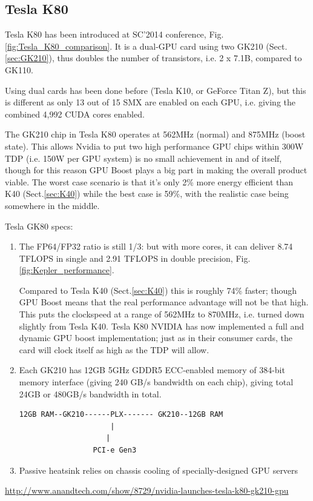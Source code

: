 \subsection{Tesla K80}
\label{sec:K80}

Tesla K80 has been introduced at SC'2014 conference,
Fig.\ref{fig:Tesla_K80_comparison}. It is a dual-GPU card using two GK210
(Sect.\ref{sec:GK210}), thus doubles the number of transistors, i.e. 2 x 7.1B,
compared to GK110. 

\begin{mdframed}
Using dual cards has been done before (Tesla K10, or GeForce Titan Z), but this
is different as only 13 out of 15 SMX are enabled on each GPU, i.e. giving the
combined  4,992 CUDA cores enabled. 

The GK210 chip in Tesla K80 operates at 562MHz (normal) and 875MHz (boost
state). This allows Nvidia to put two high performance GPU chips within 300W TDP
(i.e. 150W per GPU system) is no small achievement in and of itself, though for
this reason GPU Boost plays a big part in making the overall product viable.
The worst case scenario is that it's only 2\% more energy efficient than K40
(Sect.\ref{sec:K40}) while the best case is 59\%, with the realistic case being
somewhere in the middle.
\end{mdframed}


Tesla GK80 specs:
\begin{enumerate}
  
  \item  The FP64/FP32 ratio is still 1/3: but with more cores, it can deliver
  8.74 TFLOPS in single and 2.91 TFLOPS in double precision,
  Fig.\ref{fig:Kepler_performance}.

Compared to Tesla K40 (Sect.\ref{sec:K40}) this is roughly 74\% faster; though
GPU Boost means that the real performance advantage will not be that high.
This puts the clockspeed at a range of 562MHz to 870MHz, i.e. turned down
slightly from Tesla K40. Tesla K80 NVIDIA has now implemented a full and dynamic
GPU boost implementation; just as in their consumer cards, the card will clock
itself as high as the TDP will allow.


  \item Each GK210 has 12GB 5GHz GDDR5 ECC-enabled memory of 384-bit memory
  interface (giving 240 GB/s bandwidth on each chip), giving total 24GB or
  480GB/s bandwidth in total.
\begin{verbatim}
12GB RAM--GK210------PLX------- GK210--12GB RAM
                     |
                    |
                 PCI-e Gen3
\end{verbatim}

    
    
    \item Passive heatsink relies on chassis cooling of specially-designed GPU servers  
    
\end{enumerate}
\url{http://www.anandtech.com/show/8729/nvidia-launches-tesla-k80-gk210-gpu}


